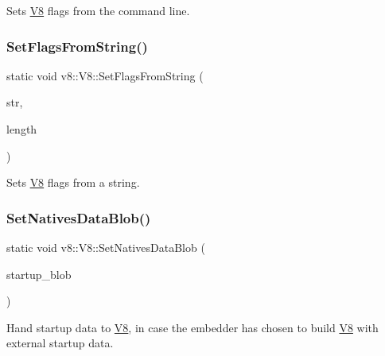 Sets \mbox{\hyperlink{classv8_1_1V8}{V8}} flags from the command line. \mbox{\label{classv8_1_1V8_ab263a85e6f97ea79d944bd20bb09a95f}} 
\subsubsection{\texorpdfstring{Set\+Flags\+From\+String()}{SetFlagsFromString()}}
{\footnotesize\ttfamily static void v8\+::\+V8\+::\+Set\+Flags\+From\+String (\begin{DoxyParamCaption}\item[{const char $\ast$}]{str,  }\item[{int}]{length }\end{DoxyParamCaption})\hspace{0.3cm}{\ttfamily [static]}}

Sets \mbox{\hyperlink{classv8_1_1V8}{V8}} flags from a string. \mbox{\label{classv8_1_1V8_ae6a0f605e072e9e27e3666559d5c351f}} 
\subsubsection{\texorpdfstring{Set\+Natives\+Data\+Blob()}{SetNativesDataBlob()}}
{\footnotesize\ttfamily static void v8\+::\+V8\+::\+Set\+Natives\+Data\+Blob (\begin{DoxyParamCaption}\item[{\mbox{\hyperlink{classv8_1_1StartupData}{Startup\+Data}} $\ast$}]{startup\+\_\+blob }\end{DoxyParamCaption})\hspace{0.3cm}{\ttfamily [static]}}

Hand startup data to \mbox{\hyperlink{classv8_1_1V8}{V8}}, in case the embedder has chosen to build \mbox{\hyperlink{classv8_1_1V8}{V8}} with external startup data.

